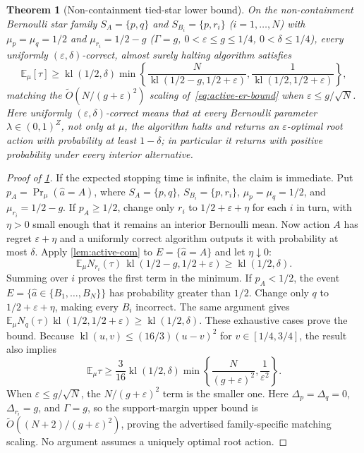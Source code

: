 \documentclass{article}
\theoremstyle{plain}
\newtheorem{theorem}{Theorem}[section]
\theoremstyle{definition}
\begin{document}
\begin{theorem}[Non-containment tied-star lower bound]
\label{thm:active-star-lb}
On the non-containment Bernoulli star family $S_A=\{p,q\}$ and $S_{B_i}=\{p,r_i\}$ ($i=1,\dots,N$) with $\mu_p=\mu_q=1/2$ and $\mu_{r_i}=1/2-g$ ($\Gamma=g$, $0<\varepsilon\le g\le 1/4$, $0<\delta\le 1/4$), every uniformly $(\varepsilon,\delta)$-correct, almost surely halting algorithm satisfies
\begin{equation}
 \mathbb E_\mu[\tau]\ge\operatorname{kl}(1/2,\delta)
 \min\!\left\{\frac{N}{\operatorname{kl}(1/2-g,1/2+\varepsilon)},
 \frac{1}{\operatorname{kl}(1/2,1/2+\varepsilon)}\right\},
 \label{eq:active-star-bound}
\end{equation}
matching the $\widetilde O(N/(g+\varepsilon)^2)$ scaling of~\eqref{eq:active-er-bound} when $\varepsilon\le g/\sqrt N$.
Here uniformly $(\varepsilon,\delta)$-correct means that at every Bernoulli parameter $\lambda\in(0,1)^Z$, not only at $\mu$, the algorithm halts and returns an $\varepsilon$-optimal root action with probability at least $1-\delta$; in particular it returns with positive probability under every interior alternative.
\end{theorem}

\begin{proof}[Proof of \cref{thm:active-star-lb}]
If the expected stopping time is infinite, the claim is immediate. Put $p_A=\Pr_\mu(\hat a=A)$, where $S_A=\{p,q\}$, $S_{B_i}=\{p,r_i\}$, $\mu_p=\mu_q=1/2$, and $\mu_{r_i}=1/2-g$. If $p_A\ge1/2$, change only $r_i$ to $1/2+\varepsilon+\eta$ for each $i$ in turn, with $\eta>0$ small enough that it remains an interior Bernoulli mean. Now action $A$ has regret $\varepsilon+\eta$ and a uniformly correct algorithm outputs it with probability at most $\delta$. Apply \cref{lem:active-com} to $E=\{\hat a=A\}$ and let $\eta\downarrow0$:
\[
 \mathbb E_\mu N_{r_i}(\tau)\,\operatorname{kl}(1/2-g,1/2+\varepsilon)
 \ge\operatorname{kl}(1/2,\delta).
\]
Summing over $i$ proves the first term in the minimum. If $p_A<1/2$, the event $E=\{\hat a\in\{B_1,\ldots,B_N\}\}$ has probability greater than $1/2$. Change only $q$ to $1/2+\varepsilon+\eta$, making every $B_i$ incorrect. The same argument gives
$\mathbb E_\mu N_q(\tau)\operatorname{kl}(1/2,1/2+\varepsilon)\ge\operatorname{kl}(1/2,\delta)$.
These exhaustive cases prove the bound. Because $\operatorname{kl}(u,v)\le(16/3)(u-v)^2$ for $v\in[1/4,3/4]$, the result also implies
\[
 \mathbb E_\mu\tau\ge\frac3{16}\operatorname{kl}(1/2,\delta)
 \min\left\{\frac{N}{(g+\varepsilon)^2},\frac1{\varepsilon^2}\right\}.
\]
When $\varepsilon\le g/\sqrt N$, the $N/(g+\varepsilon)^2$ term is the smaller one. Here $\Delta_p=\Delta_q=0$, $\Delta_{r_i}=g$, and $\Gamma=g$, so the support-margin upper bound is $\widetilde O((N+2)/(g+\varepsilon)^2)$, proving the advertised family-specific matching scaling. No argument assumes a uniquely optimal root action.
\end{proof}
\end{document}
